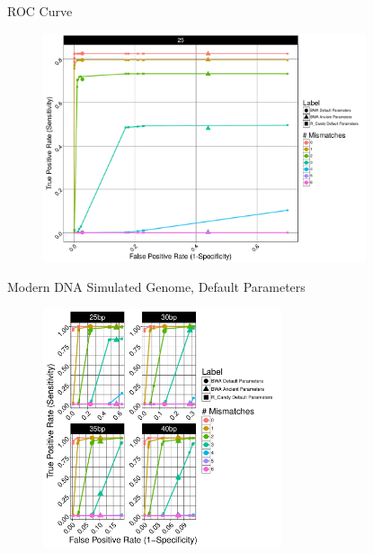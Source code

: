 \documentclass{beamer}
\begin{document}
\begin{frame}{ROC Curve}

	\begin{figure}[H]
		\centering
		\includegraphics[width=9.5cm]{pics/DS6-25_O.pdf}
		
	\end{figure}

\end{frame}




\begin{frame}{\small{Modern DNA Simulated Genome, Default Parameters}}
	
	\begin{figure}[H]
\centering
\includegraphics[width=7cm]{pics/f_DS3_emp.pdf}
\end{figure}
\end{frame}
\end{document}
